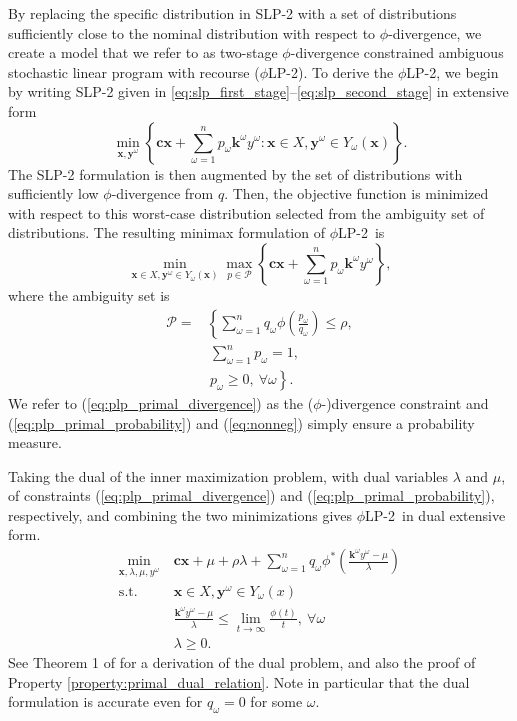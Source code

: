 \documentclass[ijoc,letterpaper]{informs3} %
\newcommand{\x}{\mathbf{x}}
\newcommand{\y}{\mathbf{y}}
\renewcommand{\c}{\mathbf{c}}
\renewcommand{\k}{\mathbf{k}}
\newcommand{\st}{\mbox{s.t.}}
\newcommand{\plp}{$\phi$LP-2}
\begin{document}
By replacing the specific distribution in SLP-2 with a set of distributions sufficiently close to the nominal distribution with respect to $\phi$-divergence, we create a model that we refer to as two-stage $\phi$-divergence constrained ambiguous stochastic linear program with recourse (\plp).
To derive the \plp, we begin by writing SLP-2 given in \eqref{eq:slp_first_stage}--\eqref{eq:slp_second_stage} in extensive form
\[
	\min_{\x,\y^\omega} \left\{ \c\x + \sum_{\omega=1}^{n} p_\omega \k^\omega y^\omega : \x \in X, \y^\omega \in Y_\omega(\x) \right\}.
\]
The SLP-2 formulation is then augmented by the set of distributions with sufficiently low $\phi$-divergence from $q$.
Then, the objective function is minimized with respect to this worst-case distribution selected from the ambiguity set of distributions.
The resulting minimax formulation of \plp\ is
\begin{equation}
	\min_{\x \in X, \y^\omega \in Y_\omega(\x)} \max_{p \in \mathcal{P}} \left\{ \c\x + \sum_{\omega=1}^{n} p_\omega \k^\omega y^\omega \right\}, \label{eq:plp_primal}
\end{equation}
where the ambiguity set is
\begin{align}
	\mathcal{P} = & \left\{ \sum_{\omega = 1}^{n} q_\omega \phi\left(\frac{p_\omega}{q_\omega}\right) \leq \rho, \right. \label{eq:plp_primal_divergence} \\
	& \ \sum_{\omega=1}^{n} p_\omega = 1, \label{eq:plp_primal_probability} \\
	& \ \left. p_\omega \geq 0,\ \forall \omega \right\}. \label{eq:nonneg}
\end{align}
We refer to (\ref{eq:plp_primal_divergence}) as the ($\phi$-)divergence constraint and (\ref{eq:plp_primal_probability}) and (\ref{eq:nonneg}) simply ensure a probability measure.

Taking the dual of the inner maximization problem, with dual variables $\lambda$ and $\mu$, of constraints (\ref{eq:plp_primal_divergence}) and (\ref{eq:plp_primal_probability}), respectively, and combining the two minimizations gives \plp\ in dual extensive form.
\begin{align*}
	\min_{\x,\lambda,\mu,y^\omega} \ & \c\x + \mu + \rho \lambda + \sum_{\omega=1}^{n} q_\omega \phi^*\left(\frac{\k^\omega y^\omega - \mu}{\lambda}\right) \\
	\st \ & \x \in X, \y^\omega \in Y_\omega(x) \nonumber \\
	& \frac{\k^\omega y^\omega - \mu}{\lambda} \leq \lim_{t \rightarrow \infty} \frac{\phi(t)}{t}, \ \forall \omega \\
	& \lambda \geq 0.
\end{align*}
See Theorem 1 of \cite{bental2011robust} for a derivation of the dual problem, and also the proof of Property \ref{property:primal_dual_relation}.
Note in particular that the dual formulation is accurate even for $q_\omega = 0$ for some $\omega$.
\end{document}
